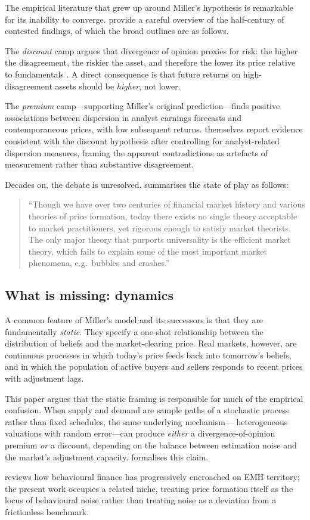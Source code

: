The empirical literature that grew up around Miller's hypothesis is
remarkable for its inability to converge. \citet{doukas2006} provide a careful
overview of the half-century of contested findings, of which the broad
outlines are as follows.

The \emph{discount} camp argues that divergence of opinion proxies for risk:
the higher the disagreement, the riskier the asset, and therefore the lower
its price relative to fundamentals \citep{williams1977,mayshar1983,
varian1985,merton1987,epsteinwang1994}. A direct consequence is that future
returns on high-disagreement assets should be \emph{higher}, not lower.

The \emph{premium} camp---supporting Miller's original prediction---finds
positive associations between dispersion in analyst earnings forecasts and
contemporaneous prices, with low subsequent returns. \citet{doukas2006}
themselves report evidence consistent with the discount hypothesis after
controlling for analyst-related dispersion measures, framing the apparent
contradictions as artefacts of measurement rather than substantive
disagreement.

Decades on, the debate is unresolved. \citet{moffitt2017} summarises the
state of play as follows:
\begin{quote}
``Though we have over two centuries of financial market history and various
theories of price formation, today there exists no single theory acceptable
to market practitioners, yet rigorous enough to satisfy market theorists.
The only major theory that purports universality is the efficient market
theory, which fails to explain some of the most important market phenomena,
e.g.\ bubbles and crashes.''
\end{quote}

\subsection{What is missing: dynamics}
\label{sec:bg-dynamics}

A common feature of Miller's model and its successors is that they are
fundamentally \emph{static}. They specify a one-shot relationship between the
distribution of beliefs and the market-clearing price. Real markets, however,
are continuous processes in which today's price feeds back into tomorrow's
beliefs, and in which the population of active buyers and sellers responds to
recent prices with adjustment lags.

This paper argues that the static framing is responsible for much of the
empirical confusion. When supply and demand are sample paths of a stochastic
process rather than fixed schedules, the same underlying mechanism---
heterogeneous valuations with random error---can produce \emph{either} a
divergence-of-opinion premium \emph{or} a discount, depending on the
balance between estimation noise and the market's adjustment capacity.
 formalises this claim.

\citet{shiller2003} reviews how behavioural finance has progressively
encroached on EMH territory; the present work occupies a related niche,
treating price formation itself as the locus of behavioural noise rather
than treating noise as a deviation from a frictionless benchmark.

